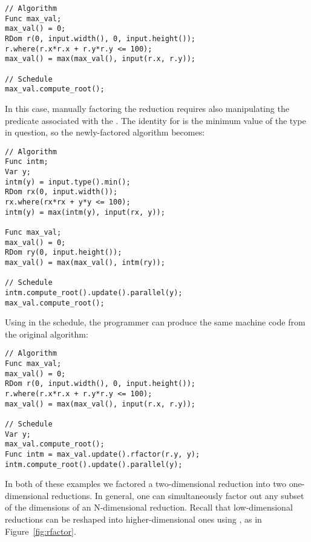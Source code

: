 \noindent
\begin{minipage}{\linewidth}
\begin{lstlisting}
// Algorithm
Func max_val;
max_val() = 0;
RDom r(0, input.width(), 0, input.height());
r.where(r.x*r.x + r.y*r.y <= 100);
max_val() = max(max_val(), input(r.x, r.y));

// Schedule
max_val.compute_root();
\end{lstlisting}
\end{minipage}

In this case, manually factoring the reduction requires also manipulating the predicate associated with the . The identity for  is the minimum value of the type in question, so the newly-factored algorithm becomes:

\noindent
\begin{minipage}{\linewidth}
\begin{lstlisting}
// Algorithm
Func intm;
Var y;
intm(y) = input.type().min();
RDom rx(0, input.width());
rx.where(rx*rx + y*y <= 100);
intm(y) = max(intm(y), input(rx, y));

Func max_val;
max_val() = 0;
RDom ry(0, input.height());
max_val() = max(max_val(), intm(ry));

// Schedule
intm.compute_root().update().parallel(y);
max_val.compute_root();
\end{lstlisting}
\end{minipage}

Using  in the schedule, the programmer can produce the same machine code from the original algorithm: %

\noindent
\begin{minipage}{\linewidth}
\begin{lstlisting}
// Algorithm
Func max_val;
max_val() = 0;
RDom r(0, input.width(), 0, input.height());
r.where(r.x*r.x + r.y*r.y <= 100);
max_val() = max(max_val(), input(r.x, r.y));

// Schedule
Var y;
max_val.compute_root();
Func intm = max_val.update().rfactor(r.y, y);
intm.compute_root().update().parallel(y);
\end{lstlisting}
\end{minipage}

In both of these examples we factored a two-dimensional reduction into two one-dimensional reductions. In general, one can simultaneously factor out any subset of the dimensions of an N-dimensional reduction. Recall that low-dimensional reductions can be reshaped into higher-dimensional ones using , as in Figure~\ref{fig:rfactor}.

